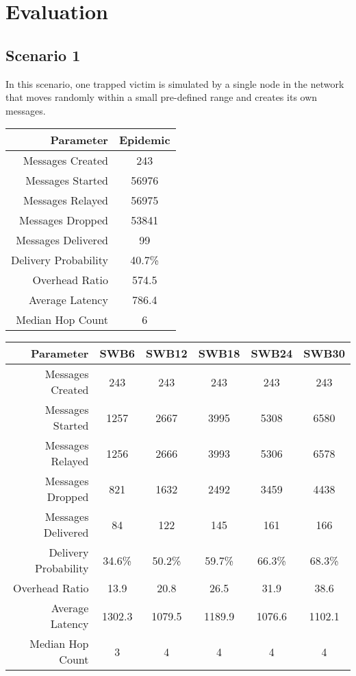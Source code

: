\documentclass{article}
\begin{document}
\section{Evaluation}
\subsection{Scenario 1}
In this scenario, one trapped victim is simulated by a single node in the network that moves randomly within a small pre-defined range and creates its own messages.

\begin{center}
\begin{tabular}{|r|c|}
\hline
\textbf{Parameter} & \textbf{Epidemic} \\ \hline
Messages Created & 243 \\ \hline
Messages Started & 56976 \\ \hline
Messages Relayed & 56975 \\ \hline
Messages Dropped & 53841 \\ \hline
Messages Delivered & 99 \\ \hline
Delivery Probability & 40.7\%\\ \hline
Overhead Ratio & 574.5 \\ \hline
Average Latency & 786.4 \\ \hline
Median Hop Count & 6 \\ \hline
\end{tabular}
\end{center}

\begin{center}
\begin{tabular}{|r|c|c|c|c|c|}
\hline
\textbf{Parameter} & \textbf{SWB6} & \textbf{SWB12} & \textbf{SWB18} & \textbf{SWB24} & \textbf{SWB30} \\ \hline
Messages Created & 243 & 243 & 243 & 243 & 243 \\ \hline
Messages Started & 1257 & 2667 & 3995 & 5308 & 6580 \\ \hline
Messages Relayed & 1256 & 2666 & 3993 & 5306 & 6578 \\ \hline
Messages Dropped & 821 & 1632 & 2492 & 3459 & 4438 \\ \hline
Messages Delivered & 84 & 122 & 145 & 161 & 166 \\ \hline
Delivery Probability & 34.6\% & 50.2\% & 59.7\% & 66.3\% & 68.3\% \\ \hline
Overhead Ratio & 13.9 & 20.8 & 26.5 & 31.9 & 38.6 \\ \hline
Average Latency & 1302.3 & 1079.5 & 1189.9 & 1076.6 & 1102.1 \\ \hline
Median Hop Count & 3 & 4 & 4 & 4 & 4\\ \hline
\end{tabular}
\end{center}
\end{document}
